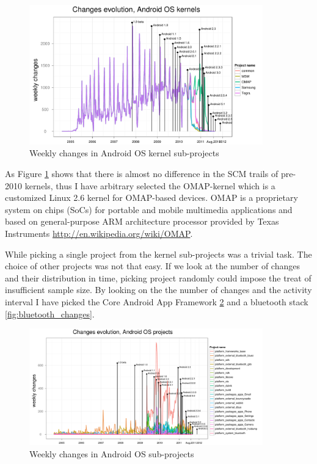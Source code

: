 \documentclass[a4paper,10pt]{article}
\numberwithin{equation}{subsection}
\begin{document}
\begin{figure}[htb]
  \centering
  \includegraphics[width=0.9\textwidth]{figures/kernels_changes.pdf}
  \caption{Weekly changes in Android OS kernel sub-projects}
  \label{fig:kernels_changes}
\end{figure}

As Figure \ref{fig:kernels_changes} shows that there is almost no difference in the SCM trails of 
pre-2010 kernels, thus I have arbitrary selected the OMAP-kernel which is a customized 
Linux 2.6 kernel for OMAP-based devices. OMAP is a proprietary system on chips (SoCs) for 
portable and mobile multimedia applications and based on general-purpose ARM architecture 
processor provided by Texas Instruments \url{http://en.wikipedia.org/wiki/OMAP}.

While picking a single project from the kernel sub-projects was a trivial task. The choice of 
other projects was not that easy. If we look at the number of changes and their distribution
in time, picking project randomly could impose the treat of insufficient sample size. By 
looking on the the number of changes and the activity interval I have picked the 
Core Android App Framework \ref{fig:projects_changes} and a bluetooth stack \ref{fig:bluetooth_changes}.

\begin{figure}[htb]
  \centering
  \includegraphics[width=0.9\textwidth]{figures/projects_changes.pdf}
  \caption{Weekly changes in Android OS sub-projects}
  \label{fig:projects_changes}
\end{figure}
\end{document}
